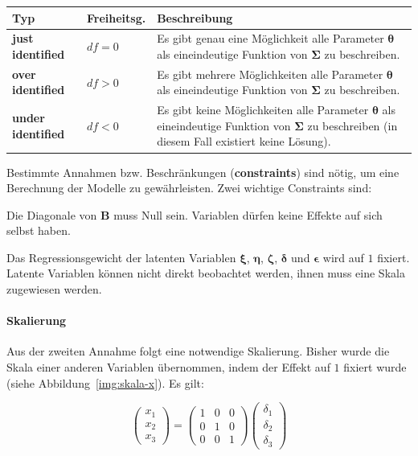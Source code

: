 \documentclass{article}
\numberwithin{equation}{section}
\begin{document}
\begin{tabular}{llp{11cm}}
\textbf{Typ} & \textbf{Freiheitsg.} & \textbf{Beschreibung}\\
\hline
\textbf{just identified} & $df = 0$ & Es gibt genau eine Möglichkeit alle Parameter $\boldsymbol\theta$ als eineindeutige Funktion von $\boldsymbol\Sigma$ zu beschreiben.\\
\textbf{over identified} & $df > 0$ & Es gibt mehrere Möglichkeiten alle Parameter $\boldsymbol\theta$ als eineindeutige Funktion von $\boldsymbol\Sigma$ zu beschreiben.\\
\textbf{under identified} & $df < 0$ & Es gibt keine Möglichkeiten alle Parameter $\boldsymbol\theta$ als eineindeutige Funktion von $\boldsymbol\Sigma$ zu beschreiben (in diesem Fall existiert keine Lösung).
\end{tabular}

Bestimmte Annahmen bzw. Beschränkungen (\textbf{constraints}) sind nötig, um eine Berechnung der Modelle zu gewährleisten. Zwei wichtige Constraints sind:

\begin{compactenum}
\item Die Diagonale von $\mathbf{B}$ muss Null sein. Variablen dürfen keine Effekte auf sich selbst haben.
\item Das Regressionsgewicht der latenten Variablen $\boldsymbol\xi$, $\boldsymbol\eta$, $\boldsymbol\zeta$, $\boldsymbol\delta$ und $\boldsymbol\epsilon$ wird auf $1$ fixiert. Latente Variablen können nicht direkt beobachtet werden, ihnen muss eine Skala zugewiesen werden.
\end{compactenum}

\paragraph*{Skalierung}

Aus der zweiten Annahme folgt eine notwendige Skalierung. Bisher wurde die Skala einer anderen Variablen übernommen, indem der Effekt auf $1$ fixiert wurde (siehe Abbildung~\ref{img:skala-x}). Es gilt:

\begin{equation}
\begin{pmatrix}
x_1\\ x_2\\ x_3
\end{pmatrix} = 
\begin{pmatrix}
1 & 0 & 0\\
0 & 1 & 0\\
0 & 0 & 1
\end{pmatrix}
\begin{pmatrix}
\delta_1\\ \delta_2\\ \delta_3
\end{pmatrix}
\end{equation}
\end{document}
